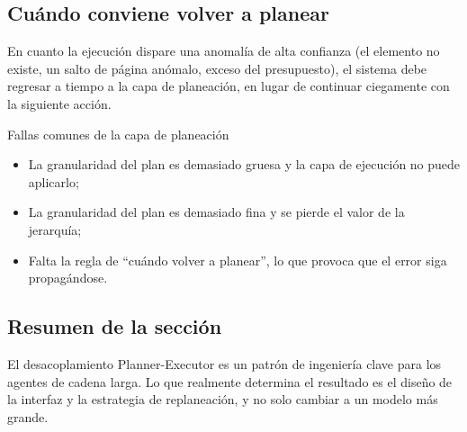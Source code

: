 \subsection{Cuándo conviene volver a planear}
En cuanto la ejecución dispare una anomalía de alta confianza (el elemento no existe, un salto de página anómalo, exceso del presupuesto), el sistema debe regresar a tiempo a la capa de planeación, en lugar de continuar ciegamente con la siguiente acción.

\begin{warningbox}{Fallas comunes de la capa de planeación}
\begin{itemize}
    \item La granularidad del plan es demasiado gruesa y la capa de ejecución no puede aplicarlo;
    \item La granularidad del plan es demasiado fina y se pierde el valor de la jerarquía;
    \item Falta la regla de ``cuándo volver a planear'', lo que provoca que el error siga propagándose.
\end{itemize}
\end{warningbox}

\subsection{Resumen de la sección}
El desacoplamiento Planner-Executor es un patrón de ingeniería clave para los agentes de cadena larga. Lo que realmente determina el resultado es el diseño de la interfaz y la estrategia de replaneación, y no solo cambiar a un modelo más grande.

